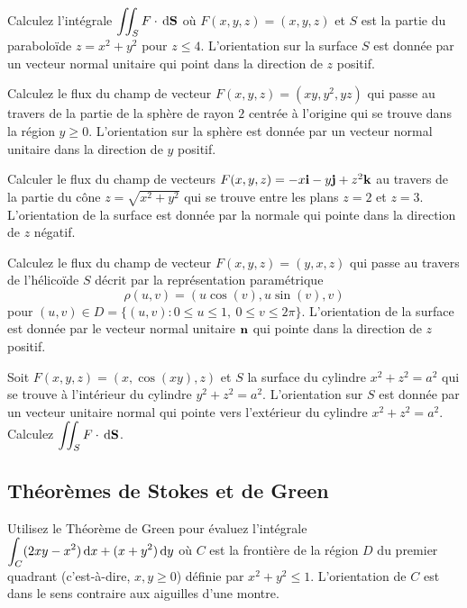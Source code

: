 \begin{question}
Calculez l'intégrale $\displaystyle \iint_S F \cdot \,\mathrm{d}\mathbf{S}$
où $F(x,y,z) = (x,y,z)$ et $S$ est la partie du paraboloïde
$z = x^2+y^2$ pour $z\leq 4$.  L'orientation sur la surface $S$ est
donnée par un vecteur normal unitaire qui point dans la direction
de $z$ positif.
\label{17Q17}
\end{question}

\begin{question}
Calculez le flux du champ de vecteur $F(x,y,z) = (xy,y^2,yz)$
qui passe au travers de la partie de la sphère de rayon $2$ centrée à
l'origine qui se trouve dans la région $y\geq 0$.  L'orientation sur
la sphère est donnée par un vecteur normal unitaire dans la direction
de $y$ positif.
\label{17Q18}
\end{question}

\begin{question}
Calculer le flux du champ de vecteurs
$F(x,y,z) = -x\mathbf{i} - y\mathbf{j} + z^2\mathbf{k}$  au travers de la partie du
cône $z=\sqrt{x^2+y^2}$ qui se trouve entre les plans $z=2$ et $z=3$.
L'orientation de la surface est donnée par la normale qui pointe
dans la direction de $z$ négatif.
\label{17Q19}
\end{question}

\begin{question}
Calculez le flux du champ de vecteur $F(x,y,z) = (y,x,z)$
qui passe au travers de l'hélicoïde $S$ décrit par la représentation
paramétrique
\[
  \rho(u,v) = (u \cos(v) , u \sin(v), v)
\]
pour $(u,v) \in D = \{(u,v) : 0\leq u \leq 1,\ 0\leq v \leq 2\pi \}$.
L'orientation de la surface est donnée par le vecteur normal unitaire
$\mathbf{n}$ qui pointe dans la direction de $z$ positif.
\label{17Q20}
\end{question}

\begin{question}
Soit $F(x,y,z) = (x, \cos(xy) , z)$ et $S$ la surface du
cylindre $x^2+z^2 = a^2$ qui se trouve à l'intérieur du cylindre
$y^2+z^2=a^2$.  L'orientation sur $S$ est donnée par un vecteur
unitaire normal qui pointe vers l'extérieur du cylindre
$x^2 + z^2 = a^2$.  Calculez
$\displaystyle \iint_S F \cdot \,\mathrm{d}\mathbf{S}$.
\label{17Q21}
\end{question}

\subsection{Théorèmes de Stokes et de Green}

\begin{question}
Utilisez le Théorème de Green pour évaluez l'intégrale
$\displaystyle \int_C(2xy -x^2)\,\mathrm{d}x + (x + y^2)\,\mathrm{d}y$
où $C$ est la frontière de la région $D$ du premier quadrant
(c'est-à-dire, $x,y \geq 0$) définie par $x^2 + y^2 \leq 1$.
L'orientation de $C$ est dans le sens contraire aux aiguilles d'une
montre.
\label{17Q22}
\end{question}

